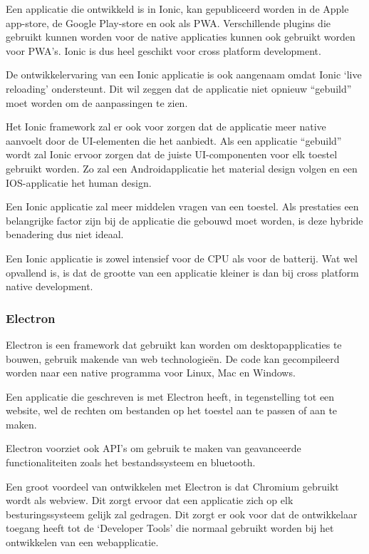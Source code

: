 		Een applicatie die ontwikkeld is in Ionic, kan gepubliceerd worden in de Apple app-store, de Google Play-store en ook als PWA. Verschillende plugins die gebruikt kunnen worden voor de native applicaties kunnen ook gebruikt worden voor PWA’s. Ionic is dus heel geschikt voor cross platform development. 
		\autocite{Ionic2020a}
		
		De ontwikkelervaring van een Ionic applicatie is ook aangenaam omdat Ionic ‘live reloading’ ondersteunt. Dit wil zeggen dat de applicatie niet opnieuw “gebuild” moet worden om de aanpassingen te zien. 
		\autocite{Lucas2020}
		
		Het Ionic framework zal er ook voor zorgen dat de applicatie meer native aanvoelt door de UI-elementen die het aanbiedt. Als een applicatie “gebuild” wordt zal Ionic ervoor zorgen dat de juiste UI-componenten voor elk toestel gebruikt worden. Zo zal een Androidapplicatie het material design volgen en een IOS-applicatie het human design. 
		
		Een Ionic applicatie zal meer middelen vragen van een toestel. Als prestaties een belangrijke factor zijn bij de applicatie die gebouwd moet worden, is deze hybride benadering dus niet ideaal.
		
		Een Ionic applicatie is zowel intensief voor de CPU als voor de batterij. Wat wel opvallend is, is dat de grootte van een applicatie kleiner is dan bij cross platform native development. 
		\autocite{Asp2017}	


	\subsubsection{Electron}
		Electron is een framework dat gebruikt kan worden om desktopapplicaties te bouwen, gebruik makende van web technologieën.  De code kan gecompileerd worden naar een native programma voor Linux, Mac en Windows.
		
		Een applicatie die geschreven is met Electron heeft, in tegenstelling tot een website, wel de rechten om bestanden op het toestel aan te passen of aan te maken.
		
		Electron voorziet ook API’s om gebruik te maken van geavanceerde functionaliteiten zoals het bestandssysteem en bluetooth.
		
		Een groot voordeel van ontwikkelen met Electron is dat Chromium gebruikt wordt als webview. Dit zorgt ervoor dat een applicatie zich op elk besturingssysteem gelijk zal gedragen. Dit zorgt er ook voor dat de ontwikkelaar toegang heeft tot de ‘Developer Tools’ die normaal gebruikt worden bij het ontwikkelen van een webapplicatie. 
		
